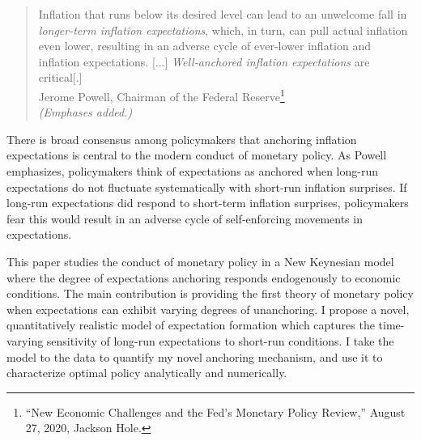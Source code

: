 \documentclass[11pt]{article}
\renewcommand{\[}{\begin{equation}}
\renewcommand{\]}{\end{equation}}
\begin{document}
\begin{quote}
Inflation that runs below its desired level can lead to an unwelcome fall in \emph{longer-term inflation expectations}, which, in turn, can pull actual inflation even lower, resulting in an adverse cycle of ever-lower inflation and inflation expectations.
[...]  \emph{Well-anchored inflation expectations} are critical[.]  \\
Jerome Powell, Chairman of the Federal Reserve\footnote{``New Economic Challenges and the Fed's Monetary Policy Review,''  August 27, 2020, Jackson Hole.} \\
\emph{(Emphases added.)}
\end{quote}	


There is broad consensus among policymakers that anchoring inflation expectations is central to the modern conduct of monetary policy. As Powell emphasizes, policymakers think of expectations as anchored when long-run expectations do not fluctuate systematically with short-run inflation surprises. If long-run expectations did respond to short-term inflation surprises, policymakers fear this would result in an adverse cycle of self-enforcing movements in expectations.

This paper studies the conduct of monetary policy in a New Keynesian model where the degree of expectations anchoring responds endogenously to economic conditions. The main contribution is providing the first theory of monetary policy when expectations can exhibit varying degrees of unanchoring. I propose a novel, quantitatively realistic model of expectation formation which captures the time-varying sensitivity of long-run expectations to short-run conditions. I take the model to the data to quantify my novel anchoring mechanism, and use it to characterize optimal policy analytically and numerically.
\end{document}
